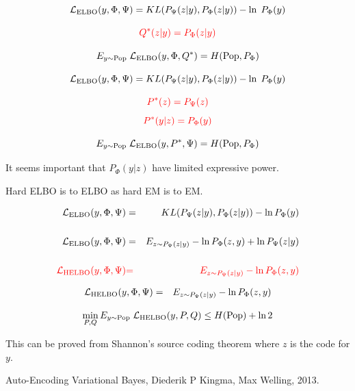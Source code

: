 {

$${\cal L}_{\mathrm{ELBO}}(y,\Phi,\Psi) = KL(P_\Psi(z|y),P_{\Phi}(z|y)) - \ln\;P_{\Phi}(y)$$

\vfill
$${\color{red} Q^*(z|y) = P_\Phi(z|y)}$$

\vfill
$$E_{y \sim \mathrm{Pop}}\;{\cal L}_{\mathrm{ELBO}}(y,\Phi,Q^*) = H(\mathrm{Pop},P_\Phi)$$


$${\cal L}_{\mathrm{ELBO}}(y,\Phi,\Psi) = KL(P_\Psi(z|y),P_{\Phi}(z|y)) - \ln\;P_{\Phi}(y)$$

$${\color{red} P^*(z) = P_\Psi(z)}$$
$${\color{red} P^*(y|z) = P_\Phi(y)}$$

$$E_{y \sim \mathrm{Pop}}\;{\cal L}_{\mathrm{ELBO}}(y,P^*,\Psi) = H(\mathrm{Pop},P_\Phi)$$

\vfill
It seems important that $P_\Phi(y|z)$ have limited expressive power.


Hard ELBO is to ELBO as hard EM is to EM.


\vfill
\begin{eqnarray*}
{\cal L}_{\mathrm{ELBO}}(y,\Phi,\Psi) &  =  & KL(P_\Psi(z|y),P_\Phi(z|y)) - \ln P_\Phi(y) \\
\\
{\cal L}_{\mathrm{ELBO}}(y,\Phi,\Psi) &  =  & E_{z \sim P_\Psi(z|y)} - \ln P_\Phi(z,y) + \ln P_\Psi(z|y) \\
\\
{\color{red} {\cal L}_{\mathrm{HELBO}}(y,\Phi,\Psi)} & {\color{red}  =} & {\color{red}  E_{z \sim P_\Psi(z|y)} - \ln P_\Phi(z,y)}
\end{eqnarray*}



\begin{eqnarray*}
{\cal L}_{\mathrm{HELBO}}(y,\Phi,\Psi) &  = &  E_{z \sim P_\Psi(z|y)} - \ln P_\Phi(z,y)
\end{eqnarray*}


\vfill
{\color{red} $$\min_{P,Q} E_{y \sim \mathrm{Pop}}\;{\cal L}_{\mathrm{HELBO}}(y,P,Q) \leq H(\mathrm{Pop}) + \ln 2$$}

\vfill
This can be proved from Shannon's source coding theorem where $z$ is the code for $y$.


Auto-Encoding Variational Bayes, Diederik P Kingma, Max Welling, 2013.

}
